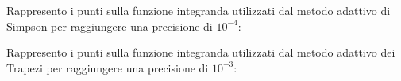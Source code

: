 Rappresento i punti sulla funzione integranda utilizzati dal metodo adattivo di
Simpson per raggiungere una precisione di $10^{-4}$:
\begin{center}   

\end{center}

Rappresento i punti sulla funzione integranda utilizzati dal metodo adattivo dei
Trapezi per raggiungere una precisione di $10^{-3}$:
\begin{center}   

\end{center}
